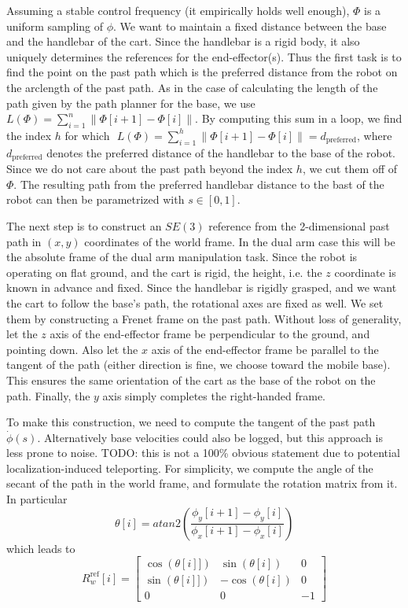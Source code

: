 \documentclass{article}
\begin{document}
Assuming a stable control frequency (it empirically holds well enough),
$ \Phi  $ is a uniform sampling of $ \phi  $.
We want to maintain a fixed distance between the base and the handlebar of
the cart. Since the handlebar is a rigid body, it also uniquely
determines the references for the end-effector(s).
Thus the first task is to find the point on the past path
which is the preferred distance from the robot on the arclength 
of the past path. As in the case of calculating the length
of the path given by the path planner for the base, 
we use 
$ L (\Phi) = \sum_{i=1}^{n} \left\lVert 
\Phi [i+1] - \Phi [i]
\right \rVert   $. 
By computing this sum in a loop, we find the index $ h  $
for which $   $
$ L (\Phi) = \sum_{i=1}^{h} \left\lVert 
\Phi [i+1] - \Phi [i]
\right \rVert  = d_{ \text{preferred} }  $,
where $ d_{ \text{preferred} }  $ denotes the preferred
distance of the handlebar to the base of the robot.
Since we do not care about the past path beyond the index $ h  $,
we cut them off of $ \Phi  $. The resulting
path from the preferred handlebar distance to the bast of the robot
can then be parametrized with $ s \in [0,1]  $.

The next step is to construct an $ SE (3)  $ reference from the 2-dimensional
past path in $ (x,y)  $ coordinates of the world frame.
In the dual arm case this will be the absolute frame
of the dual arm manipulation task.
Since the robot is operating on flat ground, and the cart is rigid,
the height, i.e. the $ z  $ coordinate is known in advance and fixed.
Since the handlebar is rigidly grasped, and we want the cart
to follow the base's path, the rotational axes are fixed as well.
We set them by constructing a Frenet frame on the past path.
Without loss of generality, let the $ z  $ axis of the end-effector frame
be perpendicular to the ground, and pointing down.
Also let the $ x  $ axis of the end-effector frame be parallel
to the tangent of the path (either direction is fine,
we choose toward the mobile base). This ensures the same orientation
of the cart as the base of the robot on the path.
Finally, the $ y   $ axis simply completes the 
right-handed frame.

To make this construction, we need to compute the tangent of the past path 
$ \dot{\phi} (s)  $. Alternatively base velocities could also be logged,
but this approach is less prone to noise.
TODO: this is not a 100\% obvious statement due to potential
localization-induced teleporting.
For simplicity, we compute the angle of the secant of the path
in the world frame, and formulate the rotation matrix from it.
In particular 
\begin{equation}
 \theta [i] = atan2 \left(  \frac{\phi_{ y } [i+1] - \phi _{ y } [i]}{\phi_{ x } [i+1] - \phi _{ x } [i]}  \right)  
\end{equation}
 which leads to
 \begin{equation}
 R_{ w }^{ \text{ref} } [i] = 
\begin{bmatrix} 
		\cos (\theta [i]]) &  \sin (\theta [i]) & 0  \\
		\sin (\theta [i]]) & - \cos(\theta [i]) & 0  \\
		0 & 0 & -1  
\end{bmatrix} 
 \end{equation}
\end{document}
